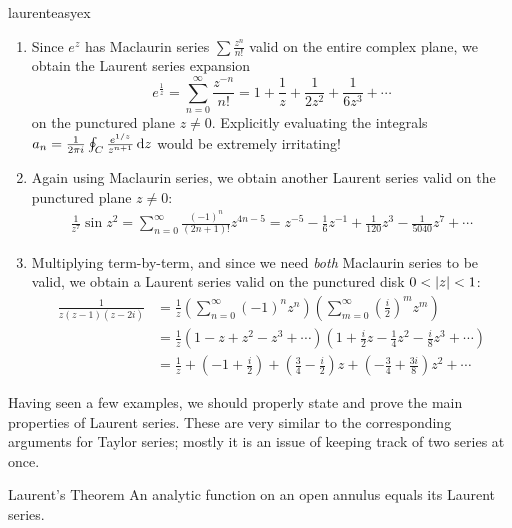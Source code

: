 \begin{examples}{}{laurenteasyex}
\begin{enumerate}
  \item Since $e^z$ has Maclaurin series $\sum \frac{z^n}{n!}$ valid on the entire complex plane, we obtain the Laurent series expansion
  \[e^{\frac 1z}=\sum_{n=0}^\infty\frac{z^{-n}}{n!}=1+\frac 1z+\frac 1{2z^2}+\frac 1{6z^3}+\cdots\]
  on the punctured plane $z\neq 0$. Explicitly evaluating the integrals $a_n=\frac 1{2\pi i}\oint_C\frac{e^{1/z}}{z^{n+1}}\,{\mathrm{d} z}$ would be extremely irritating!
  
  \item Again using Maclaurin series, we obtain another Laurent series valid on the punctured plane $z\neq 0$:
  \begin{align*}
  \frac 1{z^7}\sin z^2=\sum_{n=0}^\infty\frac{(-1)^n}{(2n+1)!}z^{4n-5} =z^{-5}-\frac 16z^{-1}+\frac 1{120}z^3-\frac 1{5040}z^7+\cdots
  \end{align*}
  
  \item Multiplying term-by-term, and since we need \emph{both} Maclaurin series to be valid, we obtain a Laurent series valid on the punctured disk $0<\left| z\right|<1$:
  \begin{align*}
  \frac 1{z(z-1)(z-2i)}&=\frac 1z\left(\sum_{n=0}^\infty (-1)^nz^n\right)\left(\sum_{m=0}^\infty\left(\frac i2\right)^mz^m\right)\\
  &=\frac 1z\left(1-z+z^2-z^3+\cdots\right)\left(1+\frac i2z-\frac 14z^2-\frac i8z^3+\cdots\right)\\
  &=\frac 1z+\left(-1+\frac i2\right)+\left(\frac 34-\frac i2\right)z+\left(-\frac 34+\frac{3i}8\right)z^2+\cdots
  \end{align*}
\end{enumerate}
\end{examples}
\goodbreak


Having seen a few examples, we should properly state and prove the main properties of Laurent series. These are very similar to the corresponding arguments for Taylor series; mostly it is an issue of keeping track of two series at once.

\begin{thm}{Laurent's Theorem}{}
An analytic function on an open annulus equals its Laurent series.
\end{thm}

